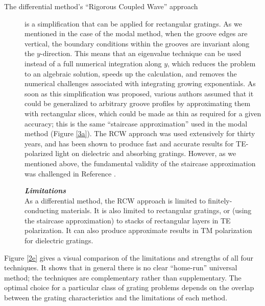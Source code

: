 \begin{description}
\item[The differential method's ``Rigorous Coupled Wave'' approach] is a simplification that can be applied for rectangular gratings.  As we mentioned in the case of the modal method, when the groove edges are vertical, the boundary conditions within the grooves are invariant along the $y$-direction.  This means that an eigenvalue technique can be used instead of a full numerical integration along $y$, which reduces the problem to an algebraic solution, speeds up the calculation, and removes the numerical challenges associated with integrating growing exponentials.  As soon as this simplification was proposed, various authors \cite{Bur66} \cite{Pen75} \cite{Moh81} assumed that it could be generalized to arbitrary groove profiles by approximating them with rectangular slices, which could be made as thin as required for a given accuracy; this is the same ``staircase approximation'' used in the modal method (Figure \ref{3a}).  The RCW approach was used extensively for thirty years, and has been shown to produce fast and accurate results for TE-polarized light on dielectric and absorbing gratings.  However, as we mentioned above, the fundamental validity of the staircase approximation was challenged in Reference \cite{Pop02}.
 
\noindent\textbf{\emph{Limitations}}\\
As a differential method, the RCW approach is limited to finitely-conducting materials.  It is also limited to rectangular gratings, or (using the staircase approximation) to stacks of rectangular layers in TE polarization.  It can also produce approximate results in TM polarization for dielectric gratings.
\end{description}
 
Figure \ref{2e} gives a visual comparison of the limitations and strengths of all four techniques.  It shows that in general there is no clear ``home-run'' universal method; the techniques are complementary rather than supplementary.  The optimal choice for a particular class of grating problems depends on the overlap between the grating characteristics and the limitations of each method.
 
